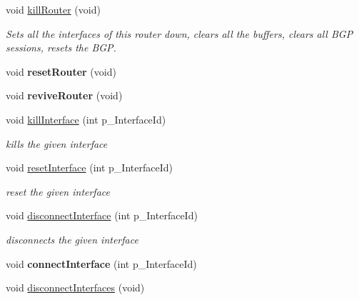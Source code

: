 \begin{DoxyCompactItemize}
\item 
\hypertarget{classRouter_aeb1245557614ed4a64e2985cec097d5b}{void \hyperlink{classRouter_aeb1245557614ed4a64e2985cec097d5b}{kill\-Router} (void)}\label{classRouter_aeb1245557614ed4a64e2985cec097d5b}

\begin{DoxyCompactList}\small\item\em Sets all the interfaces of this router down, clears all the buffers, clears all B\-G\-P sessions, resets the B\-G\-P. \end{DoxyCompactList}\item 
\hypertarget{classRouter_a9999f57baf9d5256ec69dcac3ca353f2}{void {\bfseries reset\-Router} (void)}\label{classRouter_a9999f57baf9d5256ec69dcac3ca353f2}

\item 
\hypertarget{classRouter_aa319f6fa86518d738e88dbbc7f6c07ea}{void {\bfseries revive\-Router} (void)}\label{classRouter_aa319f6fa86518d738e88dbbc7f6c07ea}

\item 
void \hyperlink{classRouter_a40a957094f6af8be1b3e8d0aae7d4c46}{kill\-Interface} (int p\-\_\-\-Interface\-Id)
\begin{DoxyCompactList}\small\item\em kills the given interface \end{DoxyCompactList}\item 
void \hyperlink{classRouter_a32df24b6aabbca7eb5bceb6e114bec2b}{reset\-Interface} (int p\-\_\-\-Interface\-Id)
\begin{DoxyCompactList}\small\item\em reset the given interface \end{DoxyCompactList}\item 
void \hyperlink{classRouter_a77e20f60d40305bcc245724c0e1224d3}{disconnect\-Interface} (int p\-\_\-\-Interface\-Id)
\begin{DoxyCompactList}\small\item\em disconnects the given interface \end{DoxyCompactList}\item 
\hypertarget{classRouter_ae8dd59d5faf07e8b95b912acba63910d}{void {\bfseries connect\-Interface} (int p\-\_\-\-Interface\-Id)}\label{classRouter_ae8dd59d5faf07e8b95b912acba63910d}

\item 
\hypertarget{classRouter_aaa7a2f17b0ab3f316c8fcf4340d23cb9}{void \hyperlink{classRouter_aaa7a2f17b0ab3f316c8fcf4340d23cb9}{disconnect\-Interfaces} (void)}\label{classRouter_aaa7a2f17b0ab3f316c8fcf4340d23cb9}


\end{DoxyCompactItemize}
